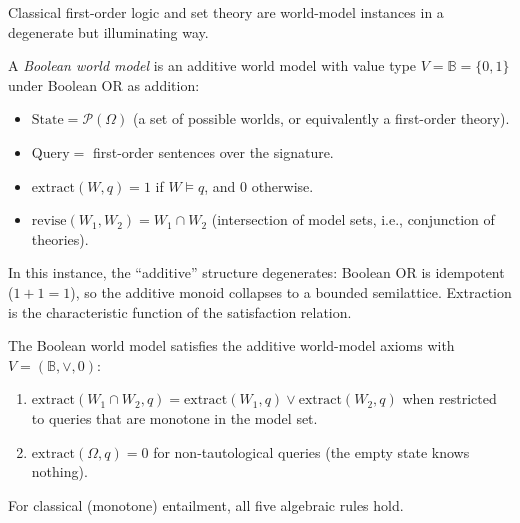Classical first-order logic and set theory are world-model instances
in a degenerate but illuminating way.

\begin{definition}
\label{def:boolean-wm}
A \emph{Boolean world model} is an additive world model with value
type $V = \mathbb{B} = \{0, 1\}$ under Boolean OR as addition:
\begin{itemize}
\item $\mathrm{State} = \mathcal{P}(\Omega)$ (a set of possible
  worlds, or equivalently a first-order theory).
\item $\mathrm{Query} = $ first-order sentences over the signature.
\item $\mathrm{extract}(W, q) = 1$ if $W \models q$, and $0$
  otherwise.
\item $\mathrm{revise}(W_1, W_2) = W_1 \cap W_2$ (intersection of
  model sets, i.e., conjunction of theories).
\end{itemize}
\end{definition}

\noindent
In this instance, the ``additive'' structure degenerates: Boolean OR
is idempotent ($1 + 1 = 1$), so the additive monoid collapses to a
bounded semilattice.  Extraction is the characteristic function of
the satisfaction relation.

\begin{theorem}
\label{thm:fol-wm}
The Boolean world model satisfies the additive world-model axioms
with $V = (\mathbb{B}, \vee, 0)$:
\begin{enumerate}
\item $\mathrm{extract}(W_1 \cap W_2, q) =
  \mathrm{extract}(W_1, q) \vee \mathrm{extract}(W_2, q)$ when
  restricted to queries that are monotone in the model set.
\item $\mathrm{extract}(\Omega, q) = 0$ for non-tautological queries
  (the empty state knows nothing).
\end{enumerate}
For classical (monotone) entailment, all five algebraic rules hold.
\end{theorem}

